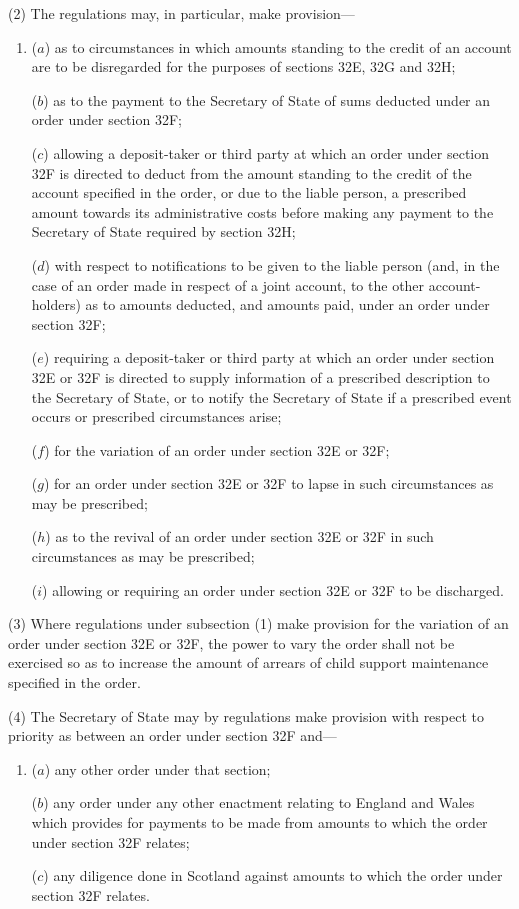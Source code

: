 \documentclass[a4paper]{article}
\begin{document}
(2) The regulations may, in particular, make provision---
\begin{enumerate}\item[]
($a$) as to circumstances in which amounts standing to the credit of an account are to be disregarded for the purposes of sections 32E, 32G and 32H;

($b$) as to the payment to the Secretary of State of sums deducted under an order under section 32F;

($c$) allowing a deposit-taker or third party at which an order under section 32F is directed to deduct from the amount standing to the credit of the account specified in the order, or due to the liable person, a prescribed amount towards its administrative costs before making any payment to the Secretary of State required by section 32H;

($d$) with respect to notifications to be given to the liable person (and, in the case of an order made in respect of a joint account, to the other account-holders) as to amounts deducted, and amounts paid, under an order under section 32F;

($e$) requiring a deposit-taker or third party at which an order under section 32E or 32F is directed to supply information of a prescribed description to the Secretary of State, or to notify the Secretary of State if a prescribed event occurs or prescribed circumstances arise;

($f$) for the variation of an order under section 32E or 32F;

($g$) for an order under section 32E or 32F to lapse in such circumstances as may be prescribed;

($h$) as to the revival of an order under section 32E or 32F in such circumstances as may be prescribed;

($i$) allowing or requiring an order under section 32E or 32F to be discharged.
\end{enumerate}

(3)
Where regulations under subsection (1) make provision for the variation of an order under section 32E or 32F, the power to vary the order shall not be exercised so as to increase the amount of arrears of child support maintenance specified in the order.

(4)
The Secretary of State may by regulations make provision with respect to priority as between an order under section 32F and---
\begin{enumerate}\item[]
($a$) any other order under that section;

($b$) any order under any other enactment relating to England and Wales which provides for payments to be made from amounts to which the order under section 32F relates;

($c$) any diligence done in Scotland against amounts to which the order under section 32F relates.
\end{enumerate}
\end{document}

